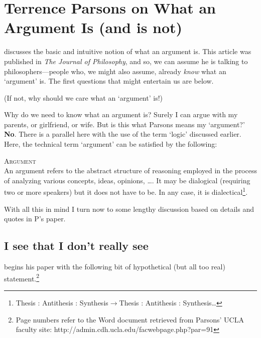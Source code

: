 \documentclass{article}
\begin{document}
\newpage

\section{Terrence Parsons on What an Argument Is (and is not)}
\cite{parsons96argument} discusses the basic and intuitive notion of what an argument is. This article was published in \textsl{The Journal of Philosophy}, and so, we can assume he is talking to philosophers---people who, we might also assume, already \textsl{know} what an `argument' is. The first questions that might entertain us are below.  

\begin{exe}
\ex {}
\ex {} 
\ex {} (If not, why should we care what an `argument' is!)
\end{exe}


Why do we need to know what an argument is? Surely I can argue with my parents, or girlfriend, or wife. But is this what Parsons means my `argument?' \textbf{No}. There is a parallel here with the use of the term `logic' discussed earlier. Here, the technical term `argument' can be satisfied by the following:

\begin{definition} \textsc{Argument}\\
An argument refers to the abstract structure of reasoning employed in the process of analyzing various concepts, ideas, opinions, \ldots. It may be dialogical (requiring two or more speakers) but it does not have to be. In any case, it is dialectical\footnote{Thesis : Antithesis : Synthesis$\longrightarrow$Thesis : Antithesis : Synthesis\ldots}.
\end{definition}
 
With all this in mind I turn now to some lengthy discussion based on details and quotes in P's paper.
 
 
\subsection{I see that I don't really see}
\cite{parsons96argument} begins his paper with the following bit of hypothetical (but all too real) statement.\footnote{Page numbers refer to the Word document retrieved from Parsons' UCLA faculty site: http://admin.cdh.ucla.edu/facwebpage.php?par=91}
\end{document}
